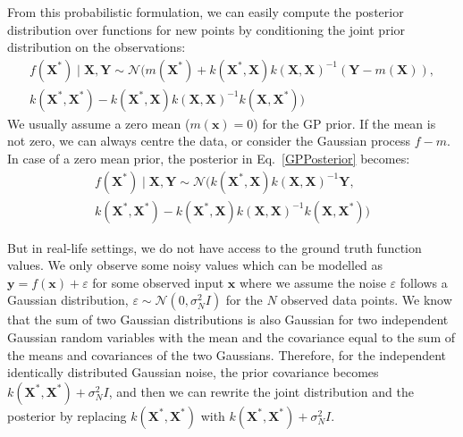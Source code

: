 From this probabilistic formulation, we can easily compute the posterior distribution over functions for new points by conditioning the joint prior distribution on the observations:
\begin{equation}\label{GPPosterior}
    \begin{aligned}
        f\left(\mathbf{X^*}\right) \mid \mathbf{X, Y} \sim \mathcal{N}(m\left(\mathbf{X^*}\right)+k\left(\mathbf{X^*}, \mathbf{X}\right) k\left(\mathbf{X}, \mathbf{X}\right)^{-1}\left(\mathbf{Y}-m\left(\mathbf{X}\right)\right),\\
        k\left(\mathbf{X^*}, \mathbf{X^*}\right)-k\left(\mathbf{X^*}, \mathbf{X}\right) k\left(\mathbf{X}, \mathbf{X}\right)^{-1} k\left(\mathbf{X}, \mathbf{X^*}\right))
    \end{aligned}
\end{equation}
We usually assume a zero mean ($m(\mathbf{x})=0$) for the GP prior. If the mean is not zero, we can always centre the data, or consider the Gaussian process $f-m$. In case of a zero mean prior, the posterior in Eq.~\ref{GPPosterior} becomes:
\begin{equation}\label{GPPosterior}
    \begin{aligned}
        f\left(\mathbf{X^*}\right) \mid \mathbf{X, Y} \sim \mathcal{N}(k\left(\mathbf{X^*}, \mathbf{X}\right) k\left(\mathbf{X}, \mathbf{X}\right)^{-1}\mathbf{Y}, \\
        k\left(\mathbf{X^*}, \mathbf{X^*}\right)-k\left(\mathbf{X^*}, \mathbf{X}\right) k\left(\mathbf{X}, \mathbf{X}\right)^{-1} k\left(\mathbf{X}, \mathbf{X^*}\right))
    \end{aligned}
\end{equation}
\newline

But in real-life settings, we do not have access to the ground truth function values. We only observe some noisy values which can be modelled as $\mathbf{y} = f(\mathbf{x}) + \varepsilon$ for some observed input $\mathbf{x}$ where we assume the noise $\varepsilon$ follows a Gaussian distribution, $\varepsilon \sim \mathcal{N}(0, \sigma^2_N I)$ for the $N$ observed data points. We know that the sum of two Gaussian distributions is also Gaussian for two independent Gaussian random variables with the mean and the covariance equal to the sum of the means and covariances of the two Gaussians. Therefore, for the independent identically distributed Gaussian noise, the prior covariance becomes $k\left(\mathbf{X^*}, \mathbf{X^*}\right) + \sigma^2_N I$, and then we can rewrite the joint distribution and the posterior by replacing $k\left(\mathbf{X^*}, \mathbf{X^*}\right)$  with $k\left(\mathbf{X^*}, \mathbf{X^*}\right) + \sigma^2_N I$.
\newline

